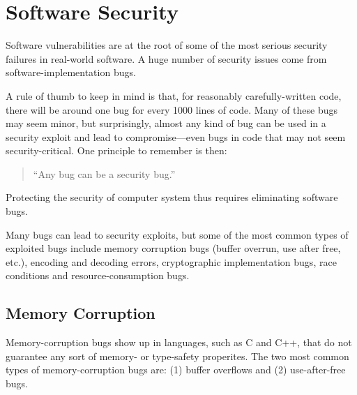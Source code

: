 \documentclass[
  letterpaper,
]{scrbook}
\theoremstyle{definition}
\theoremstyle{plain}
\theoremstyle{plain}
\theoremstyle{remark}
\begin{document}
\chapter{Software Security}\label{software-security-1}

Software vulnerabilities are at the root of some of the most serious
security failures in real-world software. A huge number of security
issues come from software-implementation bugs.


A rule of thumb to keep in mind is that, for reasonably
carefully-written code, there will be around one bug for every 1000
lines of code. Many of these bugs may seem minor, but surprisingly,
almost any kind of bug can be used in a security exploit and lead to
compromise---even bugs in code that may not seem security-critical. One
principle to remember is then:


\begin{quote}
``Any bug can be a security bug.''
\end{quote}

Protecting the security of computer system thus requires eliminating
software bugs.

Many bugs can lead to security exploits, but some of the most common
types of exploited bugs include memory corruption bugs (buffer overrun,
use after free, etc.), encoding and decoding errors, cryptographic
implementation bugs, race conditions and resource-consumption bugs.

\section{Memory Corruption}\label{memory-corruption}

Memory-corruption bugs show up in languages, such as C and C++, that do
not guarantee any sort of memory- or type-safety properites. The two
most common types of memory-corruption bugs are: (1) buffer overflows
and (2) use-after-free bugs.
\end{document}
